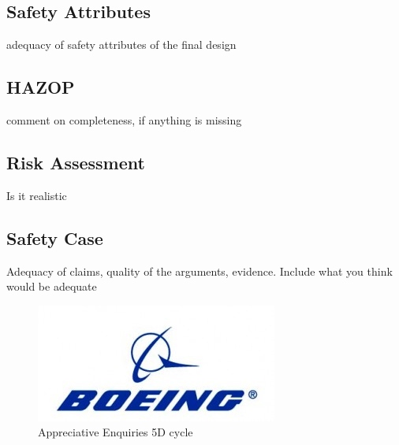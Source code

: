 \documentclass[12pt,a4paper]{article}
\begin{document}
\subsection{Safety Attributes}
adequacy of safety attributes of the final design
\subsection{HAZOP}
comment on completeness, if anything is missing
\subsection{Risk Assessment}
Is it realistic
\subsection{Safety Case}
Adequacy of claims, quality of the arguments, evidence. Include what you think would be adequate


\begin{figure}[H]
\centering
\includegraphics[scale=0.5]{Imgs/boeinglogo}
\caption[5Ds of Appreciative Enquiry]{Appreciative Enquiries 5D cycle\protect\cite{kular2008employee}}
\end{figure}
\end{document}
